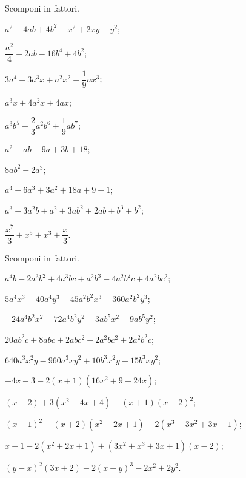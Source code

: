\begin{esercizio}[\Ast]
 \label{ese:13.98}
 Scomponi in fattori.
\begin{multicols}{2}
 \begin{enumeratea}
\item $a^{2}+4{ab}+4b^{2}-x^{2}+2xy-y^{2}$;
\item $\dfrac{a^{2}}{4}+2{ab}-16b^{4}+4b^{2}$;
\item $3a^{4}-3a^{3}x+a^{2}x^{2}-\dfrac{1}{9}ax^{3}$;
\item $a^{3}x+4a^{2}x+4ax$;
\item $a^{3}b^{5}-\dfrac{2}{3}a^{2}b^{6}+\dfrac{1}{9}ab^{7}$;
\item $a^{2}-{ab}-9a+3b+18$;
\item $8{ab}^{2}-2a^{3}$;
\item $a^{4}-6a^{3}+3a^{2}+18a+9-1$;
\item $a^{3}+3a^{2}b+a^{2}+3{ab}^{2}+2{ab}+b^{3}+b^{2}$;
\item $\dfrac{x^{7}}{3}+x^{5}+x^{3}+\dfrac{x}{3}$.
 \end{enumeratea}
\end{multicols}
\end{esercizio}

\begin{esercizio}[\Ast]
 \label{ese:13.99}
 Scomponi in fattori.
 \begin{enumeratea}
\item $a^{4}b-2a^{3}b^{2}+4a^{3}{bc}+a^{2}b^{3}-4a^{2}b^{2}c+4a^{2}bc^{2}$;
\item $5a^{4}x^{3}-40a^{4}y^{3}-45a^{2}b^{2}x^{3}+360a^{2}b^{2}y^{3}$;
\item $-24a^{4}b^{2}x^{2}-72a^{4}b^{2}y^{2}-3ab^{5}x^{2}-9ab^{5}y^{2}$;
\item $20ab^{2}c+8abc+2abc^{2}+2a^{2}bc^{2}+2a^{2}b^{2}c$;
\item $640a^{3}x^{2}y-960a^{3}xy^{2}+10b^{3}x^{2}y-15b^{3}xy^{2}$;
\item $-4x-3-2(x+1)(16x^{2}+9+24x)$;
\item $(x-2)+3(x^{2}-4x+4)-(x+1)(x-2)^{2}$;
\item $(x-1)^{2}-(x+2)(x^{2}-2x+1)-2(x^{3}-3x^{2}+3x-1)$;
\item $x+1-2(x^{2}+2x+1)+(3x^{2}+x^{3}+3x+1)(x-2)$;
\item $(y-x)^{2}(3x+2)-2(x-y)^{3}-2x^{2}+2y^{2}$.
 \end{enumeratea}
\end{esercizio}


